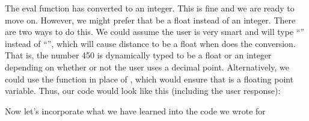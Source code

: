 \documentclass[letterpaper,10pt,english]{sphinxmanual}
\begin{document}
\sphinxAtStartPar
The eval function has converted  to an integer.  This is fine and we are ready to move on.  However, we might prefer that  be a float instead of an integer.  There are two ways to do this.  We could assume the user is very smart and will type “” instead of “”, which will cause distance to be a float when  does the conversion.  That is, the number 450 is dynamically typed to be a float or an integer depending on whether or not the user uses a decimal point.  Alternatively, we could use the function  in place of , which would ensure that  is a floating point variable.  Thus, our code would look like this (including the user response):

\begin{sphinxVerbatim}[commandchars=\\\{\},numbers=left,firstnumber=1,stepnumber=1]
  



  

\end{sphinxVerbatim}

\sphinxAtStartPar
Now let’s incorporate what we have learned into the code we wrote for {\hyperref[\detokenize{chap2/chap2_basics:chap2-scriptexmp1}]{}}
\end{document}
